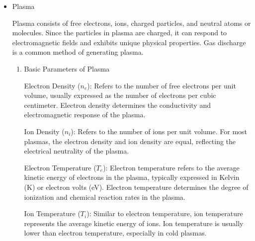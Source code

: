 \begin{enumerate}
\begin{itemize}
\begin{enumerate}
			The Paschen curve is a graphical representation of Paschen's Law, showing the relationship between the breakdown voltage \( V_b \) and \( pd \). The Paschen curve typically exhibits a "U" shape, indicating that at a certain \( pd \) value, the breakdown voltage reaches its minimum. When \( pd \) is very small, the breakdown voltage is high, and it is difficult for the gas to break down. This is because at low gas pressure, the molecule density is low, and it is hard for electrons to gain enough energy to cause ionization. When \( pd \) is very large, the breakdown voltage is also high, as the large electrode gap or high pressure causes electrons to lose more energy before reaching the other electrode, necessitating higher voltage to break down the gas. The minimum point at the bottom of the curve corresponds to the minimum breakdown voltage, and the \( pd \) value at this point is referred to as the "optimal condition."
		\end{enumerate}
		
		\item Plasma
		
		Plasma consists of free electrons, ions, charged particles, and neutral atoms or molecules. Since the particles in plasma are charged, it can respond to electromagnetic fields and exhibits unique physical properties. Gas discharge is a common method of generating plasma.
		
		\begin{enumerate}
			\item Basic Parameters of Plasma
			
			Electron Density (\( n_e \)): Refers to the number of free electrons per unit volume, usually expressed as the number of electrons per cubic centimeter. Electron density determines the conductivity and electromagnetic response of the plasma.
			
			Ion Density (\( n_i \)): Refers to the number of ions per unit volume. For most plasmas, the electron density and ion density are equal, reflecting the electrical neutrality of the plasma.
			
			Electron Temperature (\( T_e \)): Electron temperature refers to the average kinetic energy of electrons in the plasma, typically expressed in Kelvin (K) or electron volts (eV). Electron temperature determines the degree of ionization and chemical reaction rates in the plasma.
			
			Ion Temperature (\( T_i \)): Similar to electron temperature, ion temperature represents the average kinetic energy of ions. Ion temperature is usually lower than electron temperature, especially in cold plasmas.
			

\end{enumerate}
\end{itemize}
\end{enumerate}

